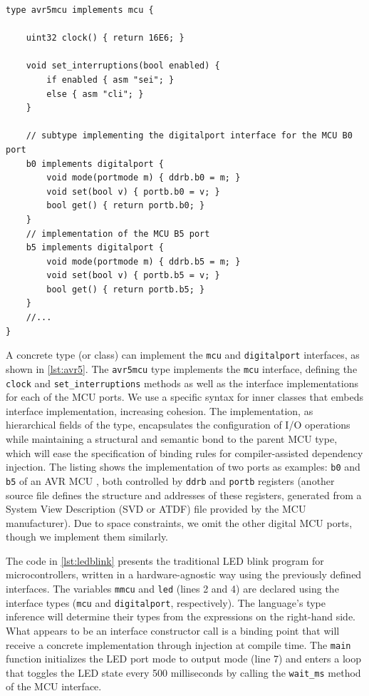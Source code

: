 \documentclass[10pt,sigplan,screen,anonymous]{acmart}
\begin{document}
\begin{lstlisting}[float=tp, caption=AVR MCU partial implementation, label=lst:avr5]
type avr5mcu implements mcu {

	uint32 clock() { return 16E6; }

	void set_interruptions(bool enabled) {
		if enabled { asm "sei"; }
		else { asm "cli"; }
	}

	// subtype implementing the digitalport interface for the MCU B0 port
	b0 implements digitalport {
		void mode(portmode m) { ddrb.b0 = m; }
		void set(bool v) { portb.b0 = v; }
		bool get() { return portb.b0; }
	}
	// implementation of the MCU B5 port
	b5 implements digitalport {
		void mode(portmode m) { ddrb.b5 = m; }
		void set(bool v) { portb.b5 = v; }
		bool get() { return portb.b5; }
	}
	//...
}
\end{lstlisting}


A concrete type (or class) can implement the {\tt mcu} and {\tt digitalport} interfaces, as shown in \autoref{lst:avr5}. The {\tt avr5mcu} type implements the {\tt mcu} interface, defining the {\tt clock} and {\tt set\_interruptions} methods as well as the interface implementations for each of the MCU ports. We use a specific syntax for inner classes that embeds interface implementation, increasing cohesion. The implementation, as hierarchical fields of the type, encapsulates the configuration of I/O operations while maintaining a structural and semantic bond to the parent MCU type, which will ease the specification of binding rules for compiler-assisted dependency injection. The listing shows the implementation of two ports as examples: {\tt b0} and {\tt b5} of an AVR MCU \cite{atmel328p}, both controlled by {\tt ddrb} and {\tt portb} registers (another source file defines the structure and addresses of these registers, generated from a System View Description (SVD or ATDF) file provided by the MCU manufacturer). Due to space constraints, we omit the other digital MCU ports, though we implement them similarly. 



The code in \autoref{lst:ledblink} presents the traditional LED blink program for microcontrollers, written in a hardware-agnostic way using the previously defined interfaces. The variables {\tt mmcu} and {\tt led} (lines 2 and 4) are declared using the interface types ({\tt mcu} and {\tt digitalport}, respectively). The language's type inference will determine their types from the expressions on the right-hand side. What appears to be an interface constructor call is a binding point that will receive a concrete implementation through injection at compile time. The {\tt main} function initializes the LED port mode to output mode (line 7) and enters a loop that toggles the LED state every 500 milliseconds by calling the {\tt wait\_ms} method of the MCU interface.
\end{document}
